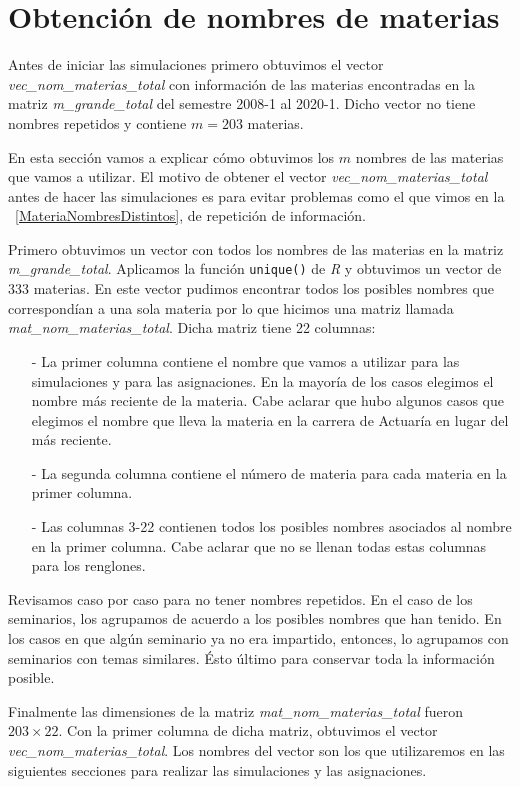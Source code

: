 \section{Obtención de nombres de materias}

Antes de iniciar las simulaciones primero obtuvimos el vector \textit{vec\_nom\_materias\_total} con información de las materias encontradas en la matriz \textit{m\_grande\_total} del semestre 2008-1 al 2020-1. Dicho vector  no tiene nombres repetidos y contiene $m = 203$ materias.

En esta sección vamos a explicar cómo obtuvimos los $m$ nombres de las materias que vamos a utilizar. El motivo de obtener el vector \textit{vec\_nom\_materias\_total} antes de hacer las simulaciones es para evitar problemas como el que vimos en la \figurename{~\ref{MateriaNombresDistintos}}, de repetición de información.

Primero obtuvimos un vector con todos los nombres de las materias en la matriz \textit{m\_grande\_total}. Aplicamos la función \verb+unique()+ de \textit{R} y obtuvimos un vector de 333 materias. En este vector pudimos encontrar todos los posibles nombres que correspondían a una sola materia por lo que hicimos una matriz llamada \textit{mat\_nom\_materias\_total}. Dicha matriz tiene 22 columnas:

\begin{itemize}
\item[-] La primer columna contiene el nombre que vamos a utilizar para las simulaciones y para las asignaciones. En la mayoría de los casos elegimos el nombre más reciente de la materia. Cabe aclarar que hubo algunos casos que elegimos el nombre que lleva la materia en la carrera de Actuaría en lugar del más reciente.

\item[-] La segunda columna contiene el número de materia para cada materia en la primer columna.

\item[-] Las columnas 3-22 contienen todos los posibles nombres asociados al nombre en la primer columna. Cabe aclarar que no se llenan todas estas columnas para los renglones.
\end{itemize}

Revisamos caso por caso para no tener nombres repetidos. En el caso de los seminarios, los agrupamos de acuerdo a los posibles nombres que han tenido. En los casos en que algún seminario ya no era impartido, entonces, lo agrupamos con seminarios con temas similares. Ésto último para conservar toda la información posible.

Finalmente las dimensiones de la matriz \textit{mat\_nom\_materias\_total} fueron $203 \times 22$. Con la primer columna de dicha matriz, obtuvimos el vector \textit{vec\_nom\_materias\_total}. Los nombres del vector son los que utilizaremos en las siguientes secciones para realizar las simulaciones y las asignaciones.





